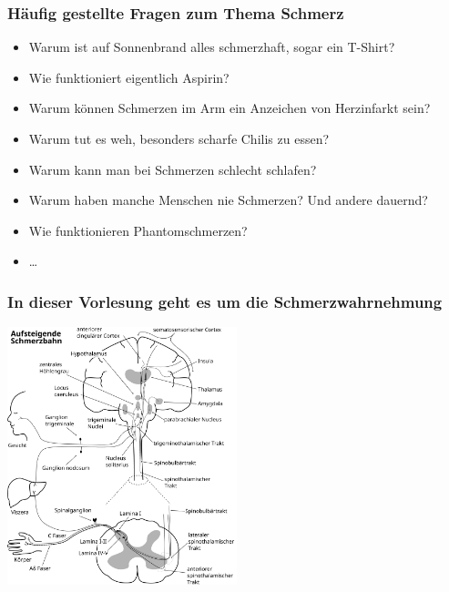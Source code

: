 \documentclass{beamer}
\begin{document}
\begin{frame}
\frametitle{Häufig gestellte Fragen zum Thema Schmerz}


\begin{itemize}
\item
Warum ist auf Sonnenbrand alles schmerzhaft, sogar ein T-Shirt?
\item
Wie funktioniert eigentlich Aspirin? 
\item
Warum können Schmerzen im Arm ein Anzeichen von Herzinfarkt sein? 
\item
Warum tut es weh, besonders scharfe Chilis zu essen?
\item
Warum kann man bei Schmerzen schlecht schlafen? 
\item
Warum haben manche Menschen nie Schmerzen? Und andere dauernd?
\item
Wie funktionieren Phantomschmerzen?  
\item
\dots 
\end{itemize}


\end{frame}





\begin{frame}
\frametitle{In dieser Vorlesung geht es um die Schmerzwahrnehmung}
\begin{center}
\includegraphics[width=0.5\textwidth]{Schmerz_aufsteigend.png}
\end{center}

\end{frame}



\end{document}
